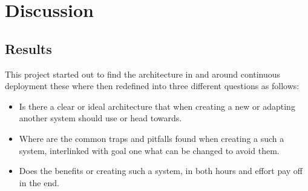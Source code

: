 %
%
%
%
%
%

\section{Discussion}
\label{sec:discussion}

\subsection{Results}

This project started out to find the architecture in and around continuous deployment these where then redefined into three different questions as follows:

\begin{itemize}
  \item Is there a clear or ideal architecture that when creating a new or adapting another system should use or head towards.\\
    \item Where are the common traps and pitfalls found when creating a such a system, interlinked  with goal one what can be changed to avoid them.\\
  \item Does the benefits or creating such a system, in both hours and effort pay off in the end.
\end{itemize}

